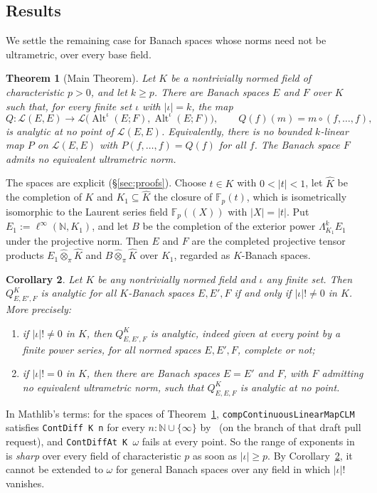 \documentclass[11pt]{amsart}
\newtheorem{theorem}{Theorem}
\newtheorem{corollary}[theorem]{Corollary}
\theoremstyle{definition}
\theoremstyle{remark}
\numberwithin{equation}{section}
\newcommand{\linf}{\ell^\infty}
\newcommand{\N}{\mathbb{N}}
\newcommand{\F}{\mathbb{F}}
\newcommand{\cL}{\mathcal{L}}
\newcommand{\Alt}{\operatorname{Alt}}
\newcommand{\Kh}{\widehat K}
\newcommand{\abs}[1]{\lvert #1\rvert}
\begin{document}
\subsection*{Results}
We settle the remaining case for Banach spaces whose norms need not be ultrametric, over every base field.

\begin{theorem}[Main Theorem]\label{thm:main}
Let $K$ be a nontrivially normed field of characteristic $p>0$, and let $k\ge p$. There are Banach spaces $E$ and $F$
over $K$ such that, for every finite set $\iota$ with $\abs\iota=k$, the map
\[
Q\colon\cL(E,E)\to\cL\bigl(\Alt^\iota(E;F),\Alt^\iota(E;F)\bigr),\qquad Q(f)(m)=m\circ(f,\dots,f),
\]
is analytic at no point of $\cL(E,E)$. Equivalently, there is no bounded $k$\nobreakdash-linear map $P$ on $\cL(E,E)$ with
$P(f,\dots,f)=Q(f)$ for all $f$. The Banach space $F$ admits no equivalent ultrametric norm.
\end{theorem}

The spaces are explicit (\S\ref{sec:proofs}). Choose $t\in K$ with $0<\abs t<1$, let $\Kh$ be the completion of $K$
and $K_1\subseteq\Kh$ the closure of $\F_p(t)$, which is isometrically isomorphic to the Laurent series field
$\F_p((X))$ with $\abs X=\abs t$. Put $E_1:=\linf(\N,K_1)$, and let $B$ be the completion of the exterior power
$\Lambda^k_{K_1}E_1$ under the projective norm. Then $E$ and $F$ are the completed projective tensor products
$E_1\widehat\otimes_\pi\Kh$ and $B\widehat\otimes_\pi\Kh$ over $K_1$, regarded as $K$\nobreakdash-Banach spaces.

\begin{corollary}\label{cor:class}
Let $K$ be any nontrivially normed field and $\iota$ any finite set. Then $Q^K_{E,E',F}$ is analytic for all
$K$\nobreakdash-Banach spaces $E,E',F$ if and only if $\abs\iota!\ne0$ in $K$. More precisely:
\begin{enumerate}
\item if $\abs\iota!\neq0$ in $K$, then $Q^K_{E,E',F}$ is analytic, indeed given at every point by a finite power
series, for all normed spaces $E,E',F$, complete or not;
\item if $\abs\iota!=0$ in $K$, then there are Banach spaces $E=E'$ and $F$, with $F$ admitting no equivalent
ultrametric norm, such that $Q^K_{E,E,F}$ is analytic at no point.
\end{enumerate}
\end{corollary}

In Mathlib's terms: for the spaces of Theorem~\ref{thm:main}, \texttt{compContinuousLinearMapCLM} satisfies
\texttt{ContDiff K n} for every $n:\N\cup\{\infty\}$ by~\cite{PR} (on the branch of that draft pull request), and \texttt{ContDiffAt K $\omega$} fails at every
point. So the range of exponents in~\cite{PR} is \emph{sharp} over every field of characteristic $p$ as soon as
$\abs\iota\ge p$. By Corollary~\ref{cor:class}, it cannot be extended to $\omega$ for general Banach spaces over any
field in which $\abs\iota!$ vanishes.
\end{document}
